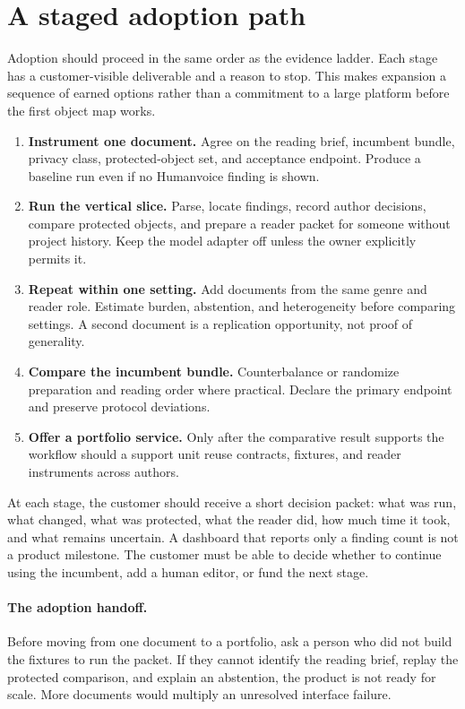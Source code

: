 \section{A staged adoption path}
\label{sec:adoption-path}

Adoption should proceed in the same order as the evidence ladder. Each stage
has a customer-visible deliverable and a reason to stop. This makes expansion
a sequence of earned options rather than a commitment to a large platform
before the first object map works.

\begin{enumerate}
\item \textbf{Instrument one document.} Agree on the reading brief,
      incumbent bundle, privacy class, protected-object set, and acceptance
      endpoint. Produce a baseline run even if no Humanvoice finding is shown.
\item \textbf{Run the vertical slice.} Parse, locate findings, record author
      decisions, compare protected objects, and prepare a reader packet for
      someone without project history. Keep the model adapter off unless the owner explicitly permits
      it.
\item \textbf{Repeat within one setting.} Add documents from the same genre
      and reader role. Estimate burden, abstention, and heterogeneity before
      comparing settings. A second document is a replication opportunity, not
      proof of generality.
\item \textbf{Compare the incumbent bundle.} Counterbalance or randomize
      preparation and reading order where practical. Declare the primary
      endpoint and preserve protocol deviations.
\item \textbf{Offer a portfolio service.} Only after the comparative result
      supports the workflow should a support unit reuse contracts, fixtures,
      and reader instruments across authors.
\end{enumerate}

At each stage, the customer should receive a short decision packet: what was
run, what changed, what was protected, what the reader did, how much time it
took, and what remains uncertain. A dashboard that reports only a finding
count is not a product milestone. The customer must be able to decide whether
to continue using the incumbent, add a human editor, or fund the next stage.

\paragraph{The adoption handoff.}
Before moving from one document to a portfolio, ask a person who did not build
the fixtures to run the packet. If they cannot identify the reading brief,
replay the protected comparison, and explain an abstention, the product is
not ready for scale. More documents would multiply an unresolved interface
failure.

